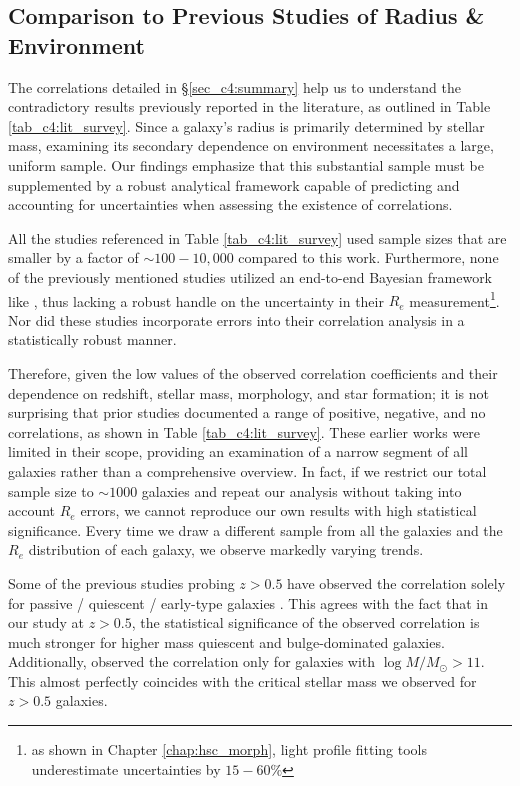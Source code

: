 \subsection{Comparison to Previous Studies of Radius \& Environment} \label{sec_c4:comp}

The correlations detailed in \S \ref{sec_c4:summary} help us to understand the contradictory results previously reported in the literature, as outlined in Table \ref{tab_c4:lit_survey}. Since a galaxy's radius is primarily determined by stellar mass, examining its secondary dependence on environment necessitates a large, uniform sample. Our findings emphasize that this substantial sample must be supplemented by a robust analytical framework capable of predicting and accounting for uncertainties when assessing the existence of correlations.

All the studies referenced in Table \ref{tab_c4:lit_survey} used sample sizes that are smaller by a factor of $\sim100-10,000$ compared to this work. Furthermore, none of the previously mentioned studies utilized an end-to-end Bayesian framework like \gampen{}, thus lacking a robust handle on the uncertainty in their $R_e$ measurement\footnote{as shown in Chapter \ref{chap:hsc_morph}, light profile fitting tools underestimate uncertainties by $15-60\%$}. Nor did these studies incorporate errors into their correlation analysis in a statistically robust manner.

Therefore, given the low values of the observed correlation coefficients and their dependence on redshift, stellar mass, morphology, and star formation; it is not surprising that prior studies documented a range of positive, negative, and no correlations, as shown in Table \ref{tab_c4:lit_survey}. These earlier works  were limited in their scope, providing an examination of a narrow segment of all galaxies rather than a comprehensive overview. In fact, if we restrict our total sample size to $\sim1000$ galaxies and repeat our analysis without taking into account $R_e$ errors, we cannot reproduce our own results with high statistical significance. Every time we draw a different sample from all the galaxies and the $R_e$ distribution of each galaxy, we observe markedly varying trends.

Some of the previous studies probing $z > 0.5$ have observed the correlation solely for passive / quiescent / early-type galaxies \citep[e.g.,][]{Cooper12,Lani13,Bassett13}. This agrees with the fact that in our study at $z > 0.5$, the statistical significance of the observed correlation is much stronger for higher mass quiescent and bulge-dominated galaxies. Additionally, \citet{Afonso19} observed the correlation only for galaxies with $\log M/M_{\odot} > 11$. This almost perfectly coincides with the critical stellar mass we observed for $z > 0.5$ galaxies. 


